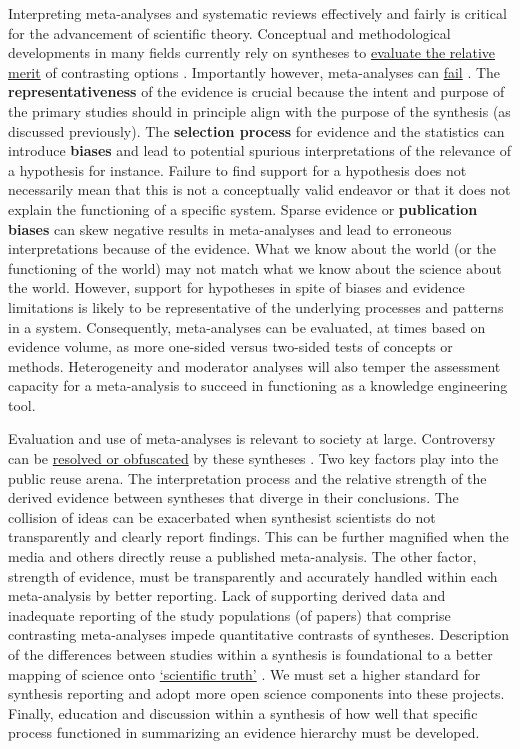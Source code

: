 \documentclass[
]{book}
\begin{document}
Interpreting meta-analyses and systematic reviews effectively and fairly is critical for the advancement of scientific theory. Conceptual and methodological developments in many fields currently rely on syntheses to \href{https://academic.oup.com/bioscience/article/70/11/1005/5908035}{evaluate the relative merit} of contrasting options \citep{RN6990}. Importantly however, meta-analyses can \href{https://onlinelibrary.wiley.com/doi/full/10.1034/j.1600-0706.2002.960316.x}{fail} \citep{RN1806}. The \textbf{representativeness} of the evidence is crucial because the intent and purpose of the primary studies should in principle align with the purpose of the synthesis (as discussed previously). The \textbf{selection process} for evidence and the statistics can introduce \textbf{biases} and lead to potential spurious interpretations of the relevance of a hypothesis for instance. Failure to find support for a hypothesis does not necessarily mean that this is not a conceptually valid endeavor or that it does not explain the functioning of a specific system. Sparse evidence or \textbf{publication biases} can skew negative results in meta-analyses and lead to erroneous interpretations because of the evidence. What we know about the world (or the functioning of the world) may not match what we know about the science about the world. However, support for hypotheses in spite of biases and evidence limitations is likely to be representative of the underlying processes and patterns in a system. Consequently, meta-analyses can be evaluated, at times based on evidence volume, as more one-sided versus two-sided tests of concepts or methods. Heterogeneity and moderator analyses will also temper the assessment capacity for a meta-analysis to succeed in functioning as a knowledge engineering tool.

Evaluation and use of meta-analyses is relevant to society at large. Controversy can be \href{https://www.science.org/news/2018/09/meta-analyses-were-supposed-end-scientific-debates-often-they-only-cause-more}{resolved or obfuscated} by these syntheses \citep{RN7354}. Two key factors play into the public reuse arena. The interpretation process and the relative strength of the derived evidence between syntheses that diverge in their conclusions. The collision of ideas can be exacerbated when synthesist scientists do not transparently and clearly report findings. This can be further magnified when the media and others directly reuse a published meta-analysis. The other factor, strength of evidence, must be transparently and accurately handled within each meta-analysis by better reporting. Lack of supporting derived data and inadequate reporting of the study populations (of papers) that comprise contrasting meta-analyses impede quantitative contrasts of syntheses. Description of the differences between studies within a synthesis is foundational to a better mapping of science onto \href{https://journals.plos.org/plosmedicine/article?id=10.1371/journal.pmed.0020124}{`scientific truth'} \citep{RN4915}. We must set a higher standard for synthesis reporting \citep{RN7238} and adopt more open science components into these projects. Finally, education and discussion within a synthesis of how well that specific process functioned in summarizing an evidence hierarchy must be developed.
\end{document}
